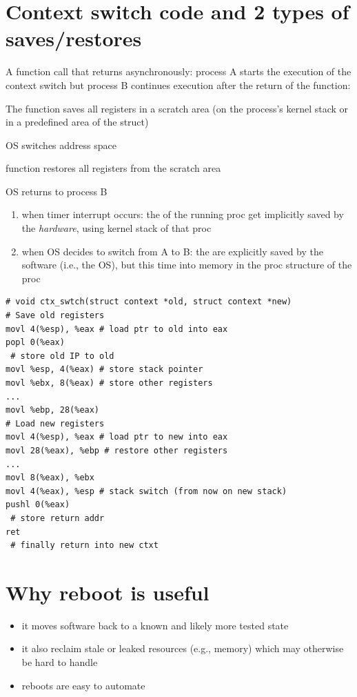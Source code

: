 \section*{Context switch code and 2 types of saves/restores}
A function call that returns asynchronously: process A starts the execution of the context switch but process B continues execution after the return of the function:
\begin{enumerate*}[label={\alph*.},font={\color{red!50!black}\bfseries}]
\item The function saves all registers in a scratch area (on the process's kernel stack or in a predefined area of the  struct)
\item OS switches address space
\item function restores all registers from the scratch area
\item OS returns to process B
\end{enumerate*}
\begin{enumerate}
\item when timer interrupt occurs: the  of the running proc get implicitly saved by the \emph{hardware}, using kernel stack of that proc
\item when OS decides to switch from A to B: the  are explicitly saved by the software (i.e., the OS), but this time into memory in the proc structure of the proc
\end{enumerate}
\begin{lstlisting}[language={[x86masm]Assembler}]
# void ctx_swtch(struct context *old, struct context *new)
# Save old registers
movl 4(%esp), %eax # load ptr to old into eax
popl 0(%eax)
 # store old IP to old
movl %esp, 4(%eax) # store stack pointer
movl %ebx, 8(%eax) # store other registers
...
movl %ebp, 28(%eax)
# Load new registers
movl 4(%esp), %eax # load ptr to new into eax
movl 28(%eax), %ebp # restore other registers
...
movl 8(%eax), %ebx
movl 4(%eax), %esp # stack switch (from now on new stack)
pushl 0(%eax)
 # store return addr
ret
 # finally return into new ctxt
\end{lstlisting}
\section*{Why reboot is useful}
\begin{itemize}
\item it moves software back to a known and likely more tested state
\item it also reclaim stale or leaked resources (e.g., memory) which may otherwise be hard to handle
\item reboots are easy to automate
\end{itemize}
